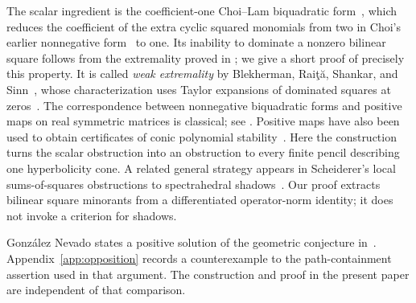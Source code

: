 The scalar ingredient is the coefficient-one Choi--Lam biquadratic
form~\cite[Section~4]{choi-lam-1977}, which reduces the coefficient of
the extra cyclic squared monomials from two in Choi's earlier
nonnegative form~\cite{choi-1975} to one. Its inability to dominate a nonzero
bilinear square follows from the extremality proved in
\cite[Theorem~4.4]{choi-lam-1977}; we give a short proof of precisely this
property. It is called \emph{weak extremality} by Blekherman, Rai\c{t}\u{a},
Shankar, and Sinn~\cite[Definition~2.7]{blekherman-raita-shankar-sinn-2022},
whose characterization uses Taylor expansions of dominated squares at
zeros~\cite[Theorem~3.2]{blekherman-raita-shankar-sinn-2022}.
The correspondence between nonnegative biquadratic forms and
positive maps on real symmetric matrices is classical; see
\cite[Section~3]{ha-2013}. Positive maps have also been used to obtain
certificates of conic polynomial stability~\cite{dey-gardoll-theobald-2021}.
Here the construction turns the scalar obstruction into an obstruction
to every finite pencil describing one hyperbolicity cone. A related
general strategy appears in Scheiderer's local sums-of-squares
obstructions to spectrahedral shadows~\cite[Section~4]{scheiderer-2018}.
Our proof extracts bilinear square minorants from a differentiated
operator-norm identity; it does not invoke a criterion for shadows.

Gonz\'alez Nevado states a positive solution of the geometric conjecture
in~\cite[Theorem~53, pp.~16--17]{gonzalez-nevado-2026}.
Appendix~\ref{app:opposition} records a counterexample to the
path-containment assertion used in that argument. The construction
and proof in the present paper are independent of that comparison.
